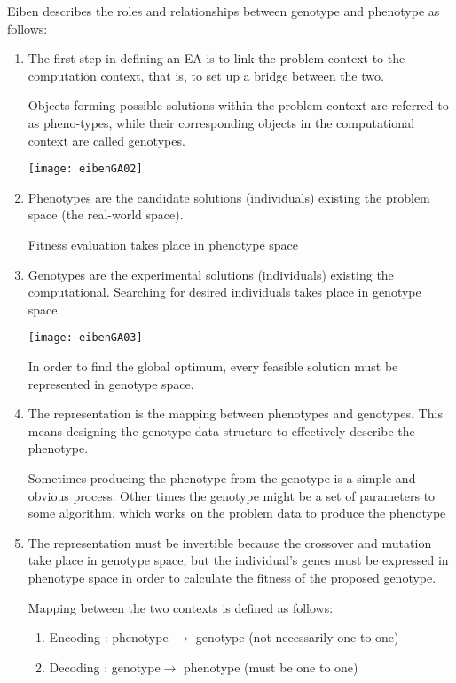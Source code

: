 Eiben describes the \cite{Eiben2015} roles and relationships between genotype and phenotype as follows:
\begin{enumerate}
\item
The first step in defining an EA is to link the problem context to the computation context, that is, to set up a bridge between the two.

Objects forming possible solutions within the problem context are referred to as pheno-types, while their corresponding objects in the computational context are called genotypes.

\begin{marginfigure}
\texttt{[image: eibenGA02]}
\end{marginfigure}
\item
Phenotypes are the candidate solutions (individuals) existing the problem space (the real-world space).

Fitness evaluation takes place in phenotype space

\item
Genotypes are the experimental solutions (individuals) existing the computational. 
Searching for desired individuals takes place in genotype space.
\begin{marginfigure}
\texttt{[image: eibenGA03]}
\end{marginfigure}

In order to find the global optimum, every feasible solution must be represented in genotype space.

\item
The representation is the mapping between phenotypes and genotypes. This means designing the genotype data structure to effectively describe the phenotype. 

Sometimes producing the phenotype from the genotype is a simple and obvious process.  Other times the
genotype might be a set of parameters to some algorithm, which works on the problem data to produce the phenotype

\item
The representation must be invertible because the crossover and mutation take place in genotype space, but the individual's genes must be expressed in phenotype space in order to calculate the fitness of the proposed genotype.

Mapping between the two contexts is defined as follows:
\begin{enumerate}

\item
Encoding : phenotype $\rightarrow$ genotype (not necessarily one to one)

\item
Decoding : genotype$\rightarrow$  phenotype (must be one to one)
\end{enumerate}

\end{enumerate}

